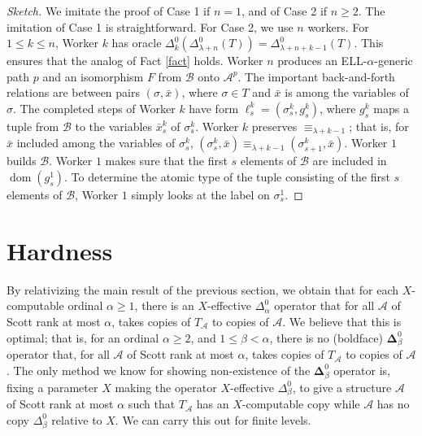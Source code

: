 \documentclass{article}
\newcommand{\ELL}{\textnormal{ELL}}
\newcommand{\bfDelta}{\boldsymbol{\Delta}}
\DeclareMathOperator{\dom}{dom}
\theoremstyle{definition}
\begin{document}
	\begin{proof} [Sketch]
		
		We imitate the proof of Case 1 if $n=1$, and of Case 2 if $n\geq 2$. The imitation of Case 1 is straightforward. For Case 2, we use $n$ workers. For $1\leq k\leq n$, Worker $k$ has oracle $\Delta^0_k(\Delta^0_{\lambda+n}(T)) = \Delta^0_{\lambda+n+k-1}(T)$. This ensures that the analog of Fact \ref{fact} holds. Worker $n$ produces an \ELL-$\alpha$-generic path $p$ and an isomorphism $F$ from $\mathcal{B}$ onto $\mathcal{A}^p$. The important back-and-forth relations are between pairs $(\sigma,\bar{x})$, where $\sigma\in T$ and $\bar{x}$ is among the variables of $\sigma$. The completed steps of Worker $k$ have form $\ell^k_s = (\sigma^k_s,g^k_s)$, where $g^k_s$ maps a tuple from $\mathcal{B}$ to the variables $\bar{x}^k_s$ of $\sigma^k_s$. Worker $k$ preserves $\equiv_{\lambda + k-1}$; that is, for $\bar{x}$ included among the variables of $\sigma^k_s$, $(\sigma^k_s,\bar{x})\equiv_{\lambda + k-1}(\sigma^k_{s+1},\bar{x})$. 
		Worker $1$ builds $\mathcal{B}$. Worker $1$ makes sure that the first $s$ elements of $\mathcal{B}$ are included in $\dom(g^1_s)$. To determine the atomic type of the tuple consisting of the first $s$ elements of $\mathcal{B}$, Worker $1$ simply looks at the label on $\sigma^1_s$. 
	\end{proof}
	
	\section{Hardness}
	
	By relativizing the main result of the previous section, we obtain that for each $X$-computable ordinal $\alpha\geq 1$, there is an $X$-effective $\Delta^0_\alpha$ operator that for all $\mathcal{A}$ of Scott rank at most $\alpha$, takes copies of $T_\mathcal{A}$ to copies of $\mathcal{A}$. We believe that this is optimal; that is, for an ordinal $\alpha\geq 2$, and $1\leq \beta < \alpha$, there is no (boldface) $\bfDelta^0_\beta$ operator that, for all $\mathcal{A}$ of Scott rank at most $\alpha$, takes copies of $T_\mathcal{A}$ to copies of $\mathcal{A}$. The only method we know for showing non-existence of the $\bfDelta^0_\beta$ operator is, fixing a parameter $X$ making the operator $X$-effective $\Delta^0_\beta$, to give a structure $\mathcal{A}$ of Scott rank at most $\alpha$ such that $T_\mathcal{A}$ has an $X$-computable copy while $\mathcal{A}$ has no copy $\Delta^0_\beta$ relative to $X$. We can carry this out for finite levels.
	
\end{document}
